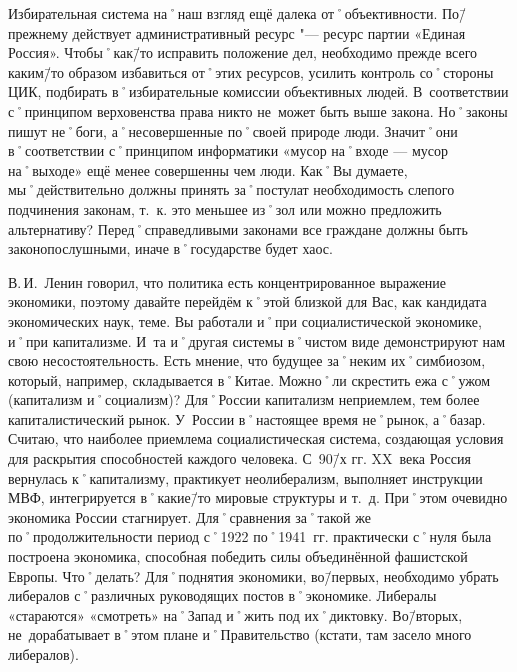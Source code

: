 \begin{drama}
	\michaelspeaks Избирательная система на˚наш взгляд ещё далека от˚объективности. По\=/прежнему действует административный ресурс "--- ресурс партии «Единая Россия». Чтобы˚как\=/то исправить положение дел, необходимо прежде всего каким\=/то образом избавиться от˚этих ресурсов, усилить контроль со˚стороны ЦИК, подбирать в˚избирательные комиссии объективных людей.	
	\maxspeaks В~соответствии с˚принципом верховенства права никто не~может быть выше закона. Но˚законы пишут не˚боги, а˚несовершенные по˚своей природе люди. Значит˚они в˚соответствии с˚принципом информатики  «мусор на˚входе — мусор на˚выходе» ещё менее совершенны чем люди. Как˚Вы думаете, мы˚действительно должны принять за˚постулат необходимость слепого подчинения законам, т.~к. это меньшее из˚зол или можно предложить альтернативу?
	\michaelspeaks Перед˚справедливыми законами все граждане должны быть законопослушными, иначе в˚государстве будет хаос.

	\maxspeaks В.\,И.~Ленин говорил, что политика есть концентрированное выражение экономики, поэтому давайте перейдём к˚этой близкой для Вас, как кандидата экономических наук, теме. Вы работали и˚при социалистической экономике, и˚при капитализме. И~та и˚другая системы в˚чистом виде демонстрируют нам свою несостоятельность. Есть мнение, что будущее за˚неким их˚симбиозом, который, например, складывается в˚Китае. Можно˚ли скрестить ежа с˚ужом (капитализм и˚социализм)?
	\michaelspeaks Для˚России капитализм неприемлем, тем более капиталистический рынок. У~России в˚настоящее время не˚рынок, а˚базар. Считаю, что наиболее приемлема социалистическая система, создающая условия для раскрытия способностей каждого человека.
	\maxspeaks С~90\=/х гг. XX~века Россия вернулась к˚капитализму, практикует неолиберализм, выполняет инструкции МВФ, интегрируется в˚какие\=/то мировые структуры и т.~д. При˚этом очевидно экономика России стагнирует. Для˚сравнения за˚такой же по˚продолжительности период с˚1922 по˚1941~гг. практически с˚нуля была построена экономика, способная победить силы объединённой фашистской Европы. Что˚делать? 
	\michaelspeaks Для˚поднятия экономики, во\=/первых, необходимо убрать либералов с˚различных руководящих постов в˚экономике. Либералы «стараются» «смотреть» на˚Запад и˚жить под их˚диктовку. Во\=/вторых, не~дорабатывает в˚этом плане и˚Правительство (кстати, там засело много либералов).


\end{drama}

